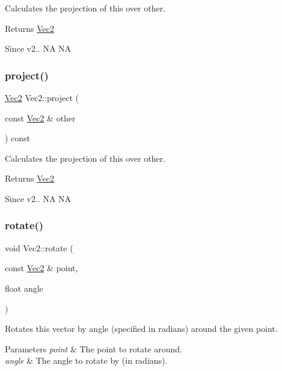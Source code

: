 Calculates the projection of this over other. \begin{DoxyReturn}{Returns}
\hyperlink{classVec2}{Vec2} 
\end{DoxyReturn}
\begin{DoxySince}{Since}
v2..  NA  NA 
\end{DoxySince}
\mbox{\label{classVec2_ad1fc26536c25f01208a26e769c980b8d}} 
\subsubsection{\texorpdfstring{project()}{project()}\hspace{0.1cm}{\footnotesize\ttfamily [2/2]}}
{\footnotesize\ttfamily \hyperlink{classVec2}{Vec2} Vec2\+::project (\begin{DoxyParamCaption}\item[{const \hyperlink{classVec2}{Vec2} \&}]{other }\end{DoxyParamCaption}) const\hspace{0.3cm}{\ttfamily [inline]}}

Calculates the projection of this over other. \begin{DoxyReturn}{Returns}
\hyperlink{classVec2}{Vec2} 
\end{DoxyReturn}
\begin{DoxySince}{Since}
v2..  NA  NA 
\end{DoxySince}
\mbox{\label{classVec2_acb4191c1852c73801734d10386722ccf}} 
\subsubsection{\texorpdfstring{rotate()}{rotate()}\hspace{0.1cm}{\footnotesize\ttfamily [1/4]}}
{\footnotesize\ttfamily void Vec2\+::rotate (\begin{DoxyParamCaption}\item[{const \hyperlink{classVec2}{Vec2} \&}]{point,  }\item[{float}]{angle }\end{DoxyParamCaption})}

Rotates this vector by angle (specified in radians) around the given point.


\begin{DoxyParams}{Parameters}
{\em point} & The point to rotate around. \\
\hline
{\em angle} & The angle to rotate by (in radians). \\
\hline
\end{DoxyParams}
\mbox{\label{classVec2_acb4191c1852c73801734d10386722ccf}} 
